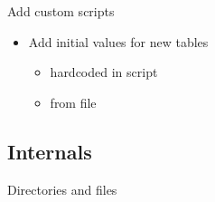 \begin{frame}{Add custom scripts}
\begin{itemize}
\item Add initial values for new tables
\begin{itemize}
\item hardcoded in script
\item from file
\end{itemize}
\end{itemize}
\end{frame}

\subsection{Internals}

\begin{frame}{Directories and files}
\end{frame}



